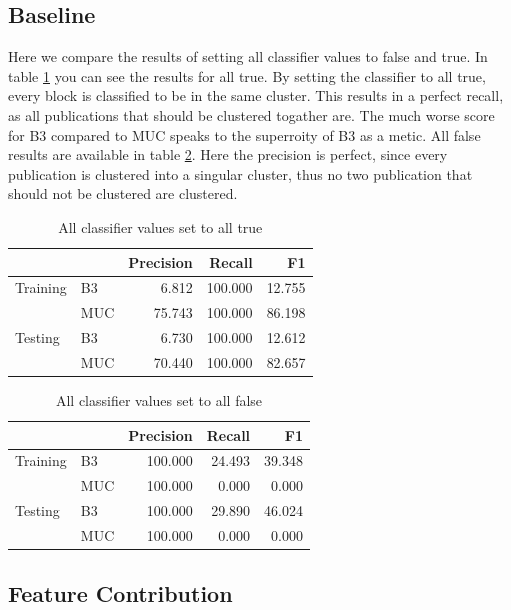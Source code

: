 \documentclass[twocolumn,letterpaper]{article}
\begin{document}
\subsection{Baseline} %
\label{sub:baseline}
Here we compare the results of setting all classifier values to false and true. In table \ref{tab:alltrue} you can see the results for all true. By setting the classifier to all true, every block is classified to be in the same cluster. This results in a perfect recall, as all publications that should be clustered togather are. The much worse score for B3 compared to MUC speaks to the superroity of B3 as a metic. All false results are available in table \ref{tab:allfalse}. Here the precision is perfect, since every publication is clustered into a singular cluster, thus no two publication that should not be clustered are clustered.

\begin{table}[ht]
\centering
\begin{tabular}{l || l | r r r}
 & & Precision & Recall & F1 \\ \hline
Training & B3 & 6.812 & 100.000 & 12.755 \\
 & MUC & 75.743 & 100.000 & 86.198 \\ \hline
Testing & B3 & 6.730 & 100.000 & 12.612 \\
 & MUC & 70.440 & 100.000 & 82.657 \\
\end{tabular}
\caption{All classifier values set to all true}
\label{tab:alltrue}
\end{table}

\begin{table}[ht]
\centering
\begin{tabular}{l || l | r r r}
 & & Precision & Recall & F1 \\ \hline
Training & B3 & 100.000 & 24.493 & 39.348 \\
 & MUC & 100.000 & 0.000 & 0.000\\ \hline
Testing & B3 & 100.000 & 29.890 & 46.024 \\
 & MUC & 100.000 & 0.000 & 0.000 \\
\end{tabular}
\caption{All classifier values set to all false}
\label{tab:allfalse}
\end{table}


\subsection{Feature Contribution} %
\label{sub:feature_contribution}
\end{document}
